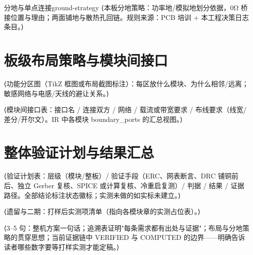 \begin{proposition}{分地与单点连接}{ground-strategy}
⟨本板分地策略：功率地/模拟地划分依据，0Ω 桥接位置与理由；两面铺地与散热孔回链。规则来源：PCB 培训 + 本工程决策日志条目。⟩
\end{proposition}

\section{板级布局策略与模块间接口}

⟨功能分区图（TikZ 框图或布局截图标注）：每区放什么模块、为什么相邻/远离；敏感网络与电感/天线的避让关系。⟩

⟨模块间接口表：接口名 / 连接双方 / 网络 / 载流或带宽要求 / 布线要求（线宽/差分/开尔文）。IR 中各模块 boundary_ports 的汇总视图。⟩

\section{整体验证计划与结果汇总}

⟨验证计划表：层级（模块/整板）/ 验证手段（ERC、网表断言、DRC 铺铜前后、独立 Gerber 复核、SPICE 或计算复核、冷重启复测）/ 判据 / 结果 / 证据路径。全部结论标注状态徽标；实测未做的如实标未建立。⟩

⟨遗留与二期：打样后实测项清单（指向各模块章的实测占位表）。⟩

\begin{conclusion}
⟨3--5 句：整机方案一句话；追溯表证明"每条需求都有出处与证据"；布局与分地策略的贯穿思想；当前证据链中 VERIFIED 与 COMPUTED 的边界——明确告诉读者哪些数字要等打样实测才能定稿。⟩
\end{conclusion}
